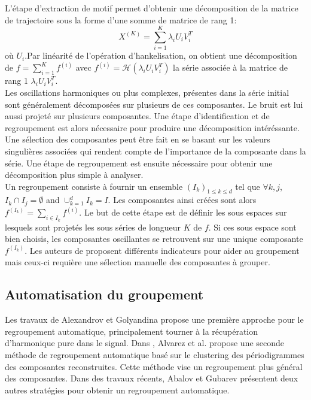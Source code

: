 \documentclass{gretsi}
\def\HH{\mathcal H}
\begin{document}
L'étape d'extraction de motif permet d'obtenir une décomposition de la matrice de trajectoire sous la forme d'une somme de matrice de rang 1:$$
X^{(K)} = \sum_{i=1}^K \lambda_i U_iV_i^T 
$$où  $U_i$.Par linéarité de l'opération d'hankelisation, on obtient une décomposition de $f = \sum_{i=1}^K f^{(i)}$ avec $f^{(i)} = \HH(\lambda_iU_iV_i^T)$ la série associée à la matrice de rang 1 $\lambda_iU_iV_i^T$.\\

Les oscillations harmoniques ou plus complexes, présentes dans la série initial sont généralement décomposées sur plusieurs de ces composantes. Le bruit est lui aussi projeté sur plusieurs composantes. Une étape d'identification et de regroupement est alors nécessaire pour produire une décomposition intéréssante. Une sélection des composantes peut être fait en se basant sur les valeurs singulières associées qui rendent compte de l'importance de la composante dans la série. Une étape de regroupement est ensuite nécessaire pour obtenir une décomposition plus simple à analyser.\\

Un regroupement consiste à fournir un ensemble $(I_k)_{1 \le k \le d}$ tel que $\forall k, j$, $I_k \cap I_j = \emptyset$ and $\displaystyle \cup_{k=1}^d I_k = I$. Les composantes ainsi créées sont alors $f^{(I_k)} = \sum_{i \in I_k} f^{(i)}$. Le but de cette étape est de définir les sous espaces sur lesquels sont projetés les sous séries de longueur $K$ de $f$. Si ces sous espace sont bien choisis, les composantes oscillantes se retrouvent sur une unique composante $f^{(I_k)}$. Les auteurs de \cite{GNZ_10_SSA} proposent différents indicateurs pour aider au groupement mais ceux-ci requière une sélection manuelle des composantes à grouper.

\subsection{Automatisation du groupement}
\label{sub:}
Les travaux de Alexandrov et Golyandina \cite{alexandrov_05_auto} propose une première approche pour le regroupement automatique, principalement tourner à la récupération d'harmonique pure dans le signal. Dans \cite{alvarez_2013_auto}, Alvarez et al. propose une seconde méthode de regroupement automatique basé sur le clustering des périodigrammes des composantes reconstruites. Cette méthode vise un regroupement plus général des composantes. Dans des travaux récents, Abalov et Gubarev \cite{abalov_14_auto} présentent deux autres stratégies pour obtenir un regroupement automatique.
\end{document}
